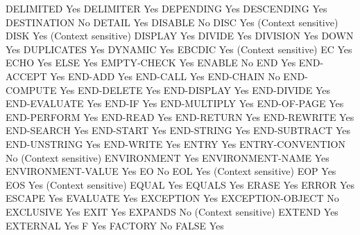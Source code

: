 DELIMITED                       Yes
DELIMITER                       Yes
DEPENDING                       Yes
DESCENDING                      Yes
DESTINATION                     No
DETAIL                          Yes
DISABLE                         No
DISC                            Yes (Context sensitive)
DISK                            Yes (Context sensitive)
DISPLAY                         Yes
DIVIDE                          Yes
DIVISION                        Yes
DOWN                            Yes
DUPLICATES                      Yes
DYNAMIC                         Yes
EBCDIC                          Yes (Context sensitive)
EC                              Yes
ECHO                            Yes
ELSE                            Yes
EMPTY-CHECK                     Yes
ENABLE                          No
END                             Yes
END-ACCEPT                      Yes
END-ADD                         Yes
END-CALL                        Yes
END-CHAIN                       No
END-COMPUTE                     Yes
END-DELETE                      Yes
END-DISPLAY                     Yes
END-DIVIDE                      Yes
END-EVALUATE                    Yes
END-IF                          Yes
END-MULTIPLY                    Yes
END-OF-PAGE                     Yes
END-PERFORM                     Yes
END-READ                        Yes
END-RETURN                      Yes
END-REWRITE                     Yes
END-SEARCH                      Yes
END-START                       Yes
END-STRING                      Yes
END-SUBTRACT                    Yes
END-UNSTRING                    Yes
END-WRITE                       Yes
ENTRY                           Yes
ENTRY-CONVENTION                No (Context sensitive)
ENVIRONMENT                     Yes
ENVIRONMENT-NAME                Yes
ENVIRONMENT-VALUE               Yes
EO                              No
EOL                             Yes (Context sensitive)
EOP                             Yes
EOS                             Yes (Context sensitive)
EQUAL                           Yes
EQUALS                          Yes
ERASE                           Yes
ERROR                           Yes
ESCAPE                          Yes
EVALUATE                        Yes
EXCEPTION                       Yes
EXCEPTION-OBJECT                No
EXCLUSIVE                       Yes
EXIT                            Yes
EXPANDS                         No (Context sensitive)
EXTEND                          Yes
EXTERNAL                        Yes
F                               Yes
FACTORY                         No
FALSE                           Yes
